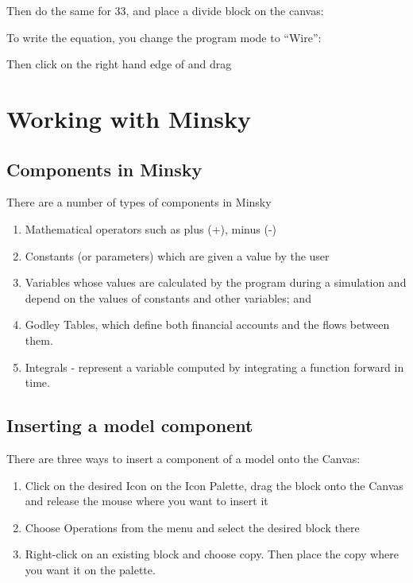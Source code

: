
Then do the same for 33, and place a divide block on the canvas:


To write the equation, you change the program mode to ``Wire'':



Then click on the right hand edge of 
and drag 

\section{Working with Minsky}

\subsection{Components in Minsky}

There are a number of types of components in Minsky
\begin{enumerate}
\item Mathematical operators such as plus (+), minus (-)
\item Constants (or parameters) which are given a value by the user
\item Variables whose values are calculated by the program during a simulation and depend on the values of constants and other variables; and
\item Godley Tables, which define both financial accounts and the
flows between them.
\item Integrals - represent a variable computed by integrating a
function forward in time.
\end{enumerate}


\subsection{Inserting a model component}


There are three ways to insert a component of a model onto the Canvas:
\begin{enumerate}
\item Click on the desired Icon on the Icon Palette, drag the block
onto the Canvas and release the mouse where you want to insert it 


\item Choose Operations from the menu and select the desired block there


\item Right-click on an existing block and choose copy. Then place the
copy where you want it on the palette. 



\end{enumerate}

